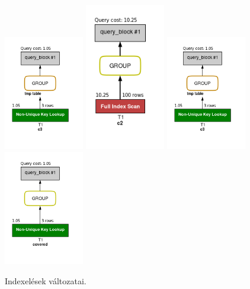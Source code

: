 \begin{figure}[h!]
\centering
\includegraphics[width=3.5cm]{images/2-2.png}
\includegraphics[width=3.5cm]{images/2-3.png}
\includegraphics[width=3.5cm]{images/2-4.png}
\includegraphics[width=3.5cm]{images/2-5.png}
\caption{Indexelések változatai.}
\label{fig:schema}
\end{figure}


